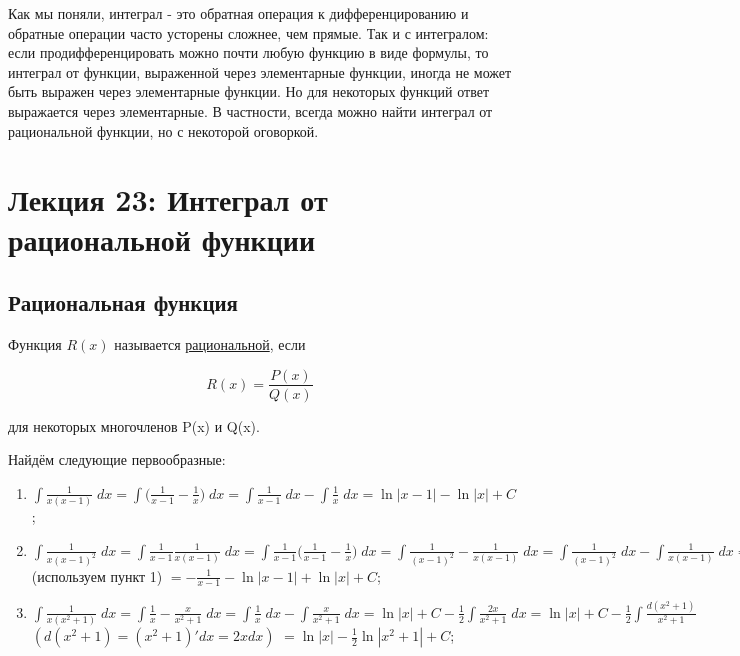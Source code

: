     Как мы поняли, интеграл - это обратная операция к дифференцированию и обратные операции часто усторены сложнее, чем прямые. Так и с интегралом: если продифференцировать можно почти любую функцию в виде формулы, то интеграл от функции, выраженной через элементарные функции, иногда не может быть выражен через элементарные функции. Но для некоторых функций ответ выражается через элементарные. В частности, всегда можно найти интеграл от рациональной функции, но с некоторой оговоркой.
	
	\newpage
	
	\section{Лекция 23: Интеграл от рациональной функции}
	
	\subsection{Рациональная функция}
	
	\begin{definition}
		Функция $R(x)$ называется \underline{рациональной}, если 
		
		\[R(x) = \frac{P(x)}{Q(x)}\]
		
		для некоторых многочленов P(x) и Q(x).
	\end{definition}
	
	\begin{example} Найдём следующие первообразные:
	
	\begin{enumerate}
		\item $\displaystyle\int \frac{1}{x(x - 1)} \; dx = \displaystyle\int \bigg(\frac{1}{x - 1} - \frac{1}{x} \bigg) \; dx = \displaystyle\int \frac{1}{x - 1} \; dx - \displaystyle\int \frac{1}{x} \; dx = \ln{|x - 1|} - \ln{|x|} + C$;
		
		\item $\displaystyle\int \frac{1}{x(x - 1)^2} \; dx = \displaystyle\int \frac{1}{x - 1}\frac{1}{x(x - 1)} \; dx = \displaystyle\int \frac{1}{x - 1}\bigg(\frac{1}{x - 1} - \frac{1}{x} \bigg) \; dx = \displaystyle\int \frac{1}{(x - 1)^2} - \frac{1}{x(x - 1)} \; dx = \displaystyle\int \frac{1}{(x - 1)^2} \; dx - \displaystyle\int \frac{1}{x(x - 1)} \; dx = \displaystyle\int \frac{1}{(x - 1)^2} \; dx - \displaystyle\int \frac{1}{x - 1} \; dx + \displaystyle\int \frac{1}{x} \; dx$ (используем пункт 1) $= -\frac{1}{x - 1} - \ln{|x - 1|} + \ln{|x|} + C$;
		
		\item $\displaystyle\int \frac{1}{x(x^2 + 1)} \; dx = \displaystyle\int \frac{1}{x} - \frac{x}{x^2 + 1} \; dx = \displaystyle\int \frac{1}{x} \; dx - \displaystyle\int \frac{x}{x^2 + 1} \; dx = \ln{|x|} + C - \frac{1}{2}\displaystyle\int \frac{2x}{x^2 + 1} \; dx = \ln{|x|} + C - \frac{1}{2}\displaystyle\int \frac{d(x^2 + 1)}{x^2 + 1}$ $(d(x^2 + 1) = (x^2 + 1)'dx = 2xdx)$ $= \ln{|x|} - \frac{1}{2}\ln{|x^2 + 1|} + C$;
		
	\end{enumerate}
	\end{example}
	
